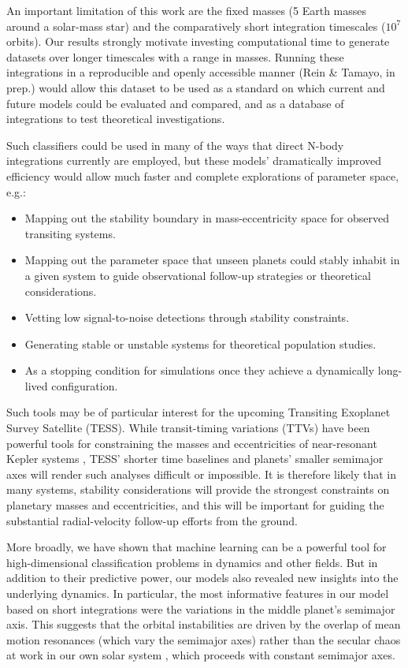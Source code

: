 An important limitation of this work are the fixed masses (5 Earth masses around a solar-mass star) and the comparatively short integration timescales ($10^7$ orbits).
Our results strongly motivate investing computational time to generate datasets over longer timescales with a range in masses.
Running these integrations in a reproducible and openly accessible manner (Rein \& Tamayo, in prep.) would allow this dataset to be used as a standard on which current and future models could be evaluated and compared, and as a database of integrations to test theoretical investigations.  

Such classifiers could be used in many of the ways that direct N-body integrations currently are employed, but these models' dramatically improved efficiency would allow much faster and complete explorations of parameter space, e.g.:
\begin{itemize}
	\item Mapping out the stability boundary in mass-eccentricity space for observed transiting systems.
	\item Mapping out the parameter space that unseen planets could stably inhabit in a given system to guide observational follow-up strategies or theoretical considerations.
	\item Vetting low signal-to-noise detections through stability constraints.
	\item Generating stable or unstable systems for theoretical population studies.
	\item As a stopping condition for simulations once they achieve a dynamically long-lived configuration.
\end{itemize}

Such tools may be of particular interest for the upcoming Transiting Exoplanet Survey Satellite (TESS).
While transit-timing variations (TTVs) have been powerful tools for constraining the masses and eccentricities of near-resonant Kepler systems \citep[e.g.,][]{Ford12, Steffen2013, Deck15}, TESS' shorter time baselines and planets' smaller semimajor axes will render such analyses difficult or impossible.
It is therefore likely that in many systems, stability considerations will provide the strongest constraints on planetary masses and eccentricities, and this will be important for guiding the substantial radial-velocity follow-up efforts from the ground. 

More broadly, we have shown that machine learning can be a powerful tool for high-dimensional classification problems in dynamics and other fields.
But in addition to their predictive power, our models also revealed new insights into the underlying dynamics.
In particular, the most informative features in our model based on short integrations were the variations in the middle planet's semimajor axis.
This suggests that the orbital instabilities are driven by the overlap of mean motion resonances (which vary the semimajor axes) rather than the secular chaos at work in our own solar system \citep{Lithwick11secularchaos, Batygin15}, which proceeds with constant semimajor axes.

